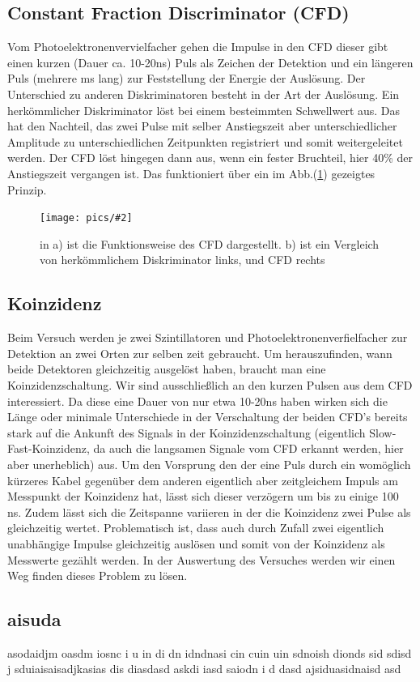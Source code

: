 \documentclass[12pt]{article}
\newcommand{\bild}[3]{\begin{figure}[H] \centering \texttt{[image: pics/\#2]} \caption{#3}	\label{img:#2} \end{figure}}
\begin{document}
\subsection{Constant Fraction Discriminator (CFD)}
Vom Photoelektronenvervielfacher gehen die Impulse in den CFD dieser gibt einen kurzen (Dauer ca. 10-20ns) Puls als Zeichen der Detektion und ein längeren Puls (mehrere ms lang) zur Feststellung der Energie der Auslösung. Der Unterschied zu anderen Diskriminatoren besteht in der Art der Auslösung. Ein herkömmlicher Diskriminator löst bei einem besteimmten Schwellwert aus. Das hat den Nachteil, das zwei Pulse mit selber Anstiegszeit aber unterschiedlicher Amplitude zu unterschiedlichen Zeitpunkten registriert und somit weitergeleitet werden. Der CFD löst hingegen dann aus, wenn ein fester Bruchteil, hier 40\% der Anstiegszeit vergangen ist. Das funktioniert über ein im Abb.(\ref{img:CFD}) gezeigtes Prinzip.
\bild{0.7}{CFD}{in a) ist die Funktionsweise des CFD dargestellt. b) ist ein Vergleich von herkömmlichem Diskriminator links, und CFD rechts}
\subsection{Koinzidenz}
Beim Versuch werden je zwei Szintillatoren und Photoelektronenverfielfacher zur Detektion an zwei Orten zur selben zeit gebraucht. Um herauszufinden, wann beide Detektoren gleichzeitig ausgelöst haben, braucht man eine Koinzidenzschaltung. Wir sind ausschließlich an den kurzen Pulsen aus dem CFD interessiert. Da diese eine Dauer von nur etwa 10-20ns haben wirken sich die Länge oder minimale Unterschiede in der Verschaltung der beiden CFD's bereits stark auf die Ankunft des Signals in der Koinzidenzschaltung (eigentlich Slow-Fast-Koinzidenz, da auch die langsamen Signale vom CFD erkannt werden, hier aber unerheblich) aus. Um den Vorsprung den der eine Puls durch ein womöglich kürzeres Kabel gegenüber dem anderen eigentlich aber zeitgleichem Impuls am Messpunkt der Koinzidenz hat, lässt sich dieser verzögern um bis zu einige 100 ns. Zudem lässt sich die Zeitspanne variieren in der die Koinzidenz zwei Pulse als gleichzeitig wertet. Problematisch ist, dass auch durch Zufall zwei eigentlich unabhängige Impulse gleichzeitig auslösen und somit von der Koinzidenz als Messwerte gezählt werden. In der Auswertung des Versuches werden wir einen Weg finden dieses Problem zu lösen.

\subsection{aisuda}
asodaidjm oasdm iosnc i u in di  dn idndnasi cin cuin uin sdnoish dionds  sid sdisd j sduiaisaisadjkasias dis diasdasd askdi iasd saiodn i d dasd ajsiduasidnaisd asd 
\newpage
\nocite{Schatz.2008}
\nocite{Wikipedia.2014}
\printbibliography

\newpage
\begin{appendix}
\section{}

\end{appendix}
\end{document}
